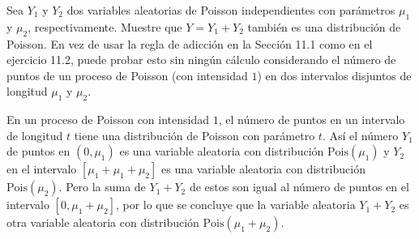 \question
	 Sea $Y_1$ y $Y_2$ dos variables aleatorias de Poisson independientes con parámetros $\mu_1$ y $\mu_2$, respectivamente. Muestre que $Y=Y_1+Y_2$ también es una distribución de Poisson. En vez de usar la regla de adicción en la Sección 11.1 como en el ejercicio 11.2, puede probar esto sin ningún cálculo considerando el número de puntos de un proceso de Poisson (con intensidad $1$) en dos intervalos disjuntos de longitud $\mu_1$ y $\mu_2$.
	
	\begin{solutionordottedlines}
		En un proceso de Poisson con intensidad $1$, el número de puntos en un intervalo de longitud $t$ tiene una distribución de Poisson con parámetro $t$. Así el número $Y_{1}$ de puntos en $\left(0,\mu_1\right)$ es una variable aleatoria con distribución $\mathrm{Pois}\left(\mu_1\right)$ y $Y_{2}$ en el intervalo $\left[\mu_1+\mu_1+\mu_2\right]$ es una variable aleatoria con distribución $\mathrm{Pois}\left(\mu_2\right)$. Pero la suma de $Y_{1}+Y_{2}$ de estos son igual al número de puntos en el intervalo $\left[0,\mu_1+\mu_2\right]$, por lo que se concluye que la variable aleatoria $Y_{1}+Y_{2}$ es otra variable aleatoria con distribución $\mathrm{Pois}\left(\mu_1+\mu_2\right)$.
	\end{solutionordottedlines}
